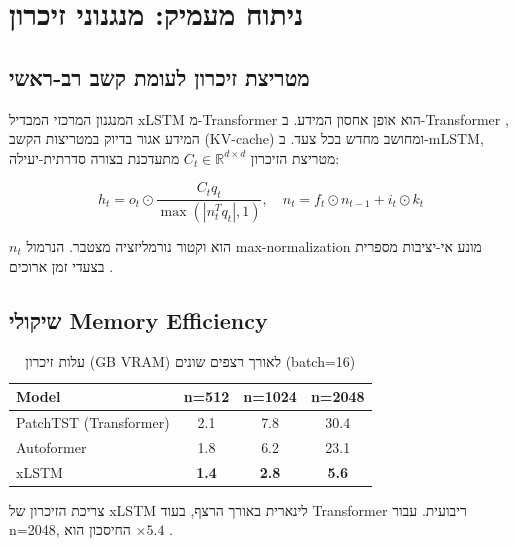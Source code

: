 
\clearpage
\chapter{ניתוח מעמיק: מנגנוני זיכרון}

\section{מטריצת זיכרון לעומת קשב רב-ראשי}

המנגנון המרכזי המבדיל \textenglish{xLSTM} מ-\textenglish{Transformer} הוא אופן אחסון המידע. ב-\textenglish{Transformer} \cite{vaswani2017attention}, המידע אגור בדיוק במטריצות הקשב (\textenglish{KV-cache}) ומחושב מחדש בכל צעד. ב-\textenglish{mLSTM}, מטריצת הזיכרון \(C_t \in \mathbb{R}^{d \times d}\) מתעדכנת בצורה סדרתית-יעילה:

\begin{equation}
h_t = o_t \odot \frac{C_t q_t}{\max(|n_t^T q_t|, 1)}, \quad n_t = f_t \odot n_{t-1} + i_t \odot k_t
\end{equation}

\(n_t\) הוא וקטור נורמליזציה מצטבר. הנרמול \textenglish{max-normalization} מונע אי-יציבות מספרית בצעדי זמן ארוכים \cite{beck2024xlstm}.

\section{שיקולי \textenglish{Memory Efficiency}}

\begin{table}[H]
\centering
\caption{עלות זיכרון (\textenglish{GB VRAM}) לאורך רצפים שונים (\textenglish{batch=16})}
\label{tab:memory}
\begin{english}
\begin{tabular}{lccc}
\toprule
\textbf{Model} & \textbf{n=512} & \textbf{n=1024} & \textbf{n=2048} \\
\midrule
PatchTST (Transformer)  & 2.1 & 7.8  & 30.4 \\
Autoformer              & 1.8 & 6.2  & 23.1 \\
xLSTM                   & \textbf{1.4} & \textbf{2.8} & \textbf{5.6} \\
\bottomrule
\end{tabular}
\end{english}
\end{table}

צריכת הזיכרון של \textenglish{xLSTM} לינארית באורך הרצף, בעוד \textenglish{Transformer} ריבועית. עבור \textenglish{n=2048}, החיסכון הוא \(\times 5.4\) \cite{gu2021s4}.
